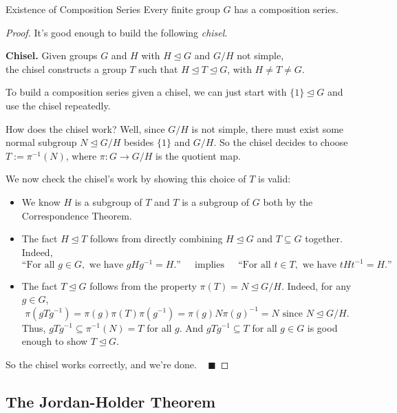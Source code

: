 \begin{theorem}{Existence of Composition Series}
    Every finite group $G$ has a composition series.
\end{theorem}

\begin{proof}
    It's good enough to build the following \emph{chisel}.
\begin{boxed-text}[32em]
    \textbf{Chisel.} Given groups $G$ and $H$ with $H \unlhd G$ and $G/H$ not simple, \\
    
    the chisel constructs a group $T$ such that $H \unlhd T \unlhd G$, with $H \neq T \neq G$.
\end{boxed-text}
    To build a composition series given a chisel, we can just start with $\{1\} \unlhd G$ and use the chisel repeatedly.

    How does the chisel work?  Well, since $G / H$ is not simple, there must exist some normal subgroup $N \unlhd G / H$ besides $\{1\}$ and $G / H$.  So the chisel decides to choose $T := \pi^{-1}(N)$, where $\pi: G \to G / H$ is the quotient map.
    
    We now check the chisel's work by showing this choice of $T$ is valid:
    \begin{itemize}
        \item We know $H$ is a subgroup of $T$ and $T$ is a subgroup of $G$ both by the Correspondence Theorem.
        \item The fact $H \unlhd T$ follows from directly combining $H \unlhd G$ and $T \subseteq G$ together.  Indeed, \vspace{-0.1cm}
        \[ \text{``For all } g \in G, \text{ we have } gHg^{-1} = H\text{.''} ~~~~~  \text{ implies } ~~~~~ \text{``For all } t \in T, \text{ we have } tHt^{-1} = H\text{.''} \] \vspace{-0.85cm}
        \item The fact $T \unlhd G$ follows from the property $\pi(T) = N \unlhd G / H$.  Indeed, for any $g \in G$,
        \[ \pi(gTg^{-1}) = \pi(g) \pi(T) \pi(g^{-1}) = \pi(g) N \pi(g)^{-1} = N \text{ since } N \unlhd G / H. \]
        Thus, $gTg^{-1} \subseteq \pi^{-1}(N) = T$ for all $g$.  And $gTg^{-1} \subseteq T$ for all $g \in G$ is good enough to show $T \unlhd G$.
    \end{itemize}
    So the chisel works correctly, and we're done. ~ $\blacksquare$
\end{proof}

\subsection{The Jordan-Holder Theorem}

